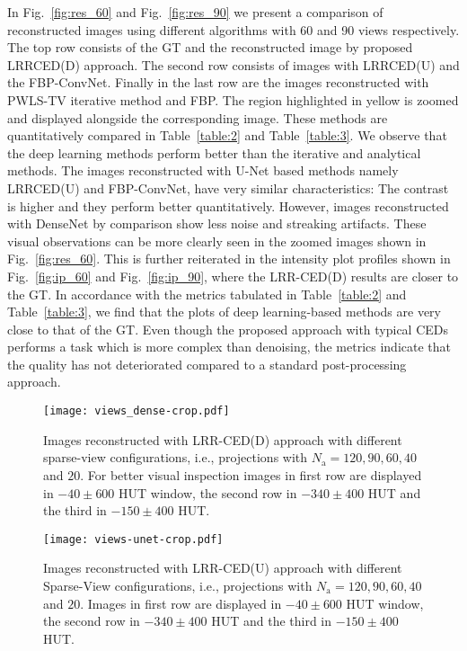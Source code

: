 In Fig.~\ref{fig:res_60} and Fig.~\ref{fig:res_90} we present a comparison of reconstructed images using different algorithms with 60 and 90 views respectively. The top row consists of the \ac{GT} and the reconstructed image by proposed \ac{LRRCED}(D) approach. The second row consists of  images with \ac{LRRCED}(U) and the FBP-ConvNet. Finally in the last row are the images reconstructed with \ac{PWLS}-\ac{TV} iterative method and \ac{FBP}. The region highlighted in yellow is zoomed and displayed alongside the corresponding image. These methods are quantitatively compared in Table~\ref{table:2} and Table~\ref{table:3}. We observe that the deep learning methods perform better than the iterative and analytical methods. The images reconstructed with U-Net based methods namely LRRCED(U) and FBP-ConvNet, have very similar characteristics: The contrast is higher and they perform better quantitatively. However, images reconstructed with DenseNet by comparison show less noise and streaking artifacts. These visual observations can be more clearly seen in the zoomed images shown in Fig.~\ref{fig:res_60}. This is further reiterated in the intensity plot profiles shown in Fig.~\ref{fig:ip_60} and Fig.~\ref{fig:ip_90}, where the LRR-CED(D) results are closer to the GT. In accordance with the metrics tabulated in Table~\ref{table:2} and Table~\ref{table:3}, we find that the plots of deep learning-based methods are very close to that of the \ac{GT}. Even though the proposed approach with typical \acp{CED} performs a task which is more complex than denoising, the metrics indicate that the quality has not deteriorated compared to a standard post-processing approach. 


\begin{figure*}[!htbp]
	\centering
	\texttt{[image: views\_dense-crop.pdf]}
	\caption{Images reconstructed with LRR-CED(D) approach with different sparse-view configurations, i.e., projections with $N_\mathrm{a}=120,90,60,40$ and $20$. For better visual inspection images in first row are displayed in $-40 \pm 600$ HUT window, the second row in $-340 \pm 400$ HUT and the third in $-150 \pm 400$ HUT.}
	\label{fig:d_ang}
\end{figure*}


\begin{figure*}[!htbp]
	\centering
	\texttt{[image: views-unet-crop.pdf]}
	\caption{Images reconstructed with LRR-CED(U) approach with different Sparse-View configurations, i.e., projections with $N_\mathrm{a}=120,90,60,40$ and $20$. Images in first row are displayed in $-40 \pm 600$ HUT window, the second row in $-340 \pm 400$ HUT and the third in $-150 \pm 400$ HUT.}
	\label{fig:u_ang}
\end{figure*}


